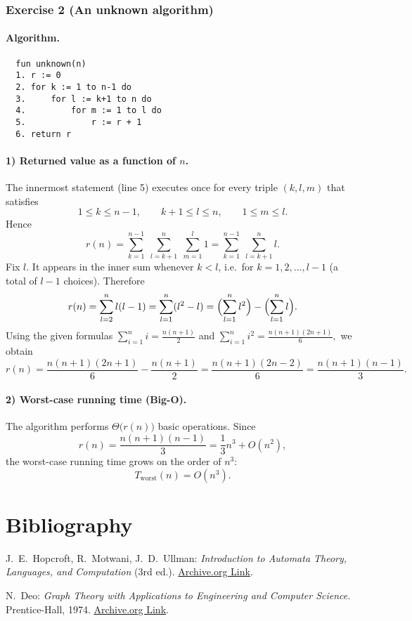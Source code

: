 \documentclass{article}
\theoremstyle{theorem}
\theoremstyle{definition}
\theoremstyle{remark}
\begin{document}
\subsubsection*{Exercise 2 (An unknown algorithm)}

\paragraph{Algorithm.}
\begin{lstlisting}
  fun unknown(n)
  1. r := 0
  2. for k := 1 to n-1 do
  3.     for l := k+1 to n do
  4.         for m := 1 to l do
  5.             r := r + 1
  6. return r
\end{lstlisting}  

\paragraph{1) Returned value as a function of \(n\).}
The innermost statement (line 5) executes once for every triple
\((k,l,m)\) that satisfies
\[
1\le k\le n-1,\qquad k+1\le l\le n,\qquad 1\le m\le l .
\]
Hence
\[
r(n)=\sum_{k=1}^{n-1}\;\sum_{l=k+1}^{n}\;\sum_{m=1}^{l}1
      =\sum_{k=1}^{n-1}\;\sum_{l=k+1}^{n} l .
\]
Fix \(l\).  It appears in the inner sum whenever \(k<l\), i.e.\ for
\(k=1,2,\dots,l-1\) (a total of \(l-1\) choices).  Therefore
\[
r(n)=\sum_{l=2}^{n} l(l-1)
     =\sum_{l=1}^{n} (l^{2}-l)
     =\Bigl(\sum_{l=1}^{n} l^{2}\Bigr)-\Bigl(\sum_{l=1}^{n} l\Bigr).
\]
Using the given formulas
\(
\sum_{i=1}^{n} i = \tfrac{n(n+1)}{2}
\)
and
\(
\sum_{i=1}^{n} i^{2}= \tfrac{n(n+1)(2n+1)}{6},
\)
we obtain
\[
r(n)=\frac{n(n+1)(2n+1)}{6}-\frac{n(n+1)}{2}
     =\frac{n(n+1)(2n-2)}{6}
     =\boxed{\dfrac{n(n+1)(n-1)}{3}}.
\]

\paragraph{2) Worst-case running time (Big-O).}
The algorithm performs \(\Theta\!\bigl(r(n)\bigr)\) basic operations.
Since
\[
r(n)=\frac{n(n+1)(n-1)}{3}
     =\frac{1}{3}n^{3}+O(n^{2}),
\]
the worst-case running time grows on the order of \(n^{3}\):
\[
\boxed{T_{\text{worst}}(n)=O(n^{3}).}
\]


\section{Bibliography}
\begin{thebibliography}{99}

  J.~E.~Hopcroft, R.~Motwani, J.~D.~Ullman:  
  \emph{Introduction to Automata Theory, Languages, and Computation} (3rd ed.).  
  \href{https://archive.org/details/hopcroft-motwani-ullman-introduction-to-automata-theory-languages-and-computations-3rd-edition/page/65/mode/1up?view=theater}{Archive.org Link}.
  
  N.~Deo:  
  \emph{Graph Theory with Applications to Engineering and Computer Science}.  
  Prentice-Hall, 1974.  
  \href{https://archive.org/details/GraphTheoryWithApplicationsToEngineeringAndComputerScience/page/n108/mode/1up?view=theater}{Archive.org Link}.
  
  \end{thebibliography}
\end{document}
